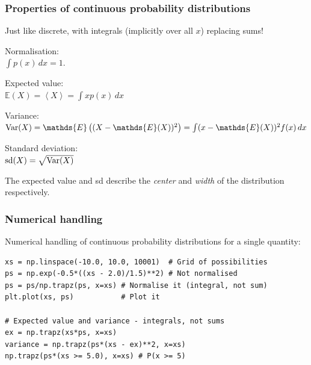 \documentclass{beamer}
\begin{document}
\begin{frame}
\frametitle{Properties of continuous probability distributions}

Just like discrete, with integrals (implicitly over all $x$) replacing sums!

\pause
Normalisation:\\ $\int p(x) \, dx = 1$.\vspace{0.5em}

\pause
Expected value:\\$\mathds{E}(X) = \left<X\right> = \int x p(x) \, dx$\vspace{0.5em}

\pause
Variance:\\$\textnormal{Var}(X) = \mathds{E}\left((X - \mathds{E}(X))^2\right) = \int (x - \mathds{E}(X))^2 f(x) \, dx$\vspace{0.5em}

\pause
Standard deviation:\\$\textnormal{sd}(X) = \sqrt{\textnormal{Var}(X)}$

\pause
The expected value and sd describe the {\em center} and {\em width}
of the distribution respectively.

\end{frame}


\begin{frame}[t, fragile]
\frametitle{Numerical handling}
Numerical handling of continuous probability distributions for a single
quantity: \vspace{2em}

\begin{verbatim}
xs = np.linspace(-10.0, 10.0, 10001)  # Grid of possibilities
ps = np.exp(-0.5*((xs - 2.0)/1.5)**2) # Not normalised
ps = ps/np.trapz(ps, x=xs) # Normalise it (integral, not sum)
plt.plot(xs, ps)           # Plot it

# Expected value and variance - integrals, not sums
ex = np.trapz(xs*ps, x=xs) 
variance = np.trapz(ps*(xs - ex)**2, x=xs)
np.trapz(ps*(xs >= 5.0), x=xs) # P(x >= 5)
\end{verbatim}


\end{frame}
\end{document}
